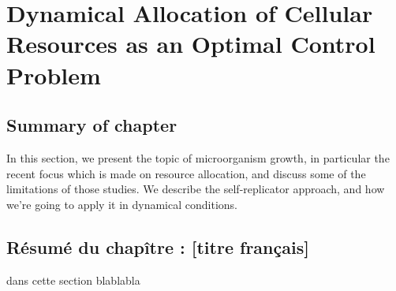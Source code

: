 \chapter{Dynamical Allocation of Cellular Resources as an Optimal Control Problem}

\section*{Summary of chapter \thechapter}
In this section, we present the topic of microorganism growth, in particular the recent focus which is made on resource allocation, and discuss some of the limitations of those studies.
We describe the self-replicator approach, and how we're going to apply it in dynamical conditions.

\section*{Résumé du chapître \thechapter : [titre français]}
dans cette section blablabla

